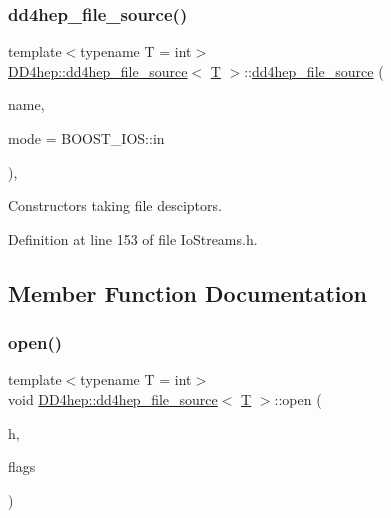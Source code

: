 \subsubsection{\texorpdfstring{dd4hep\+\_\+file\+\_\+source()}{dd4hep\_file\_source()}\hspace{0.1cm}{\footnotesize\ttfamily [4/4]}}
{\footnotesize\ttfamily template$<$typename T = int$>$ \\
\hyperlink{class_d_d4hep_1_1dd4hep__file__source}{D\+D4hep\+::dd4hep\+\_\+file\+\_\+source}$<$ \hyperlink{class_t}{T} $>$\+::\hyperlink{class_d_d4hep_1_1dd4hep__file__source}{dd4hep\+\_\+file\+\_\+source} (\begin{DoxyParamCaption}\item[{const char $\ast$}]{name,  }\item[{B\+O\+O\+S\+T\+\_\+\+I\+O\+S\+::openmode}]{mode = {\ttfamily BOOST\+\_\+IOS\+:\+:in} }\end{DoxyParamCaption})\hspace{0.3cm}{\ttfamily [inline]}, {\ttfamily [explicit]}}



Constructors taking file desciptors. 



Definition at line 153 of file Io\+Streams.\+h.



\subsection{Member Function Documentation}
\hypertarget{class_d_d4hep_1_1dd4hep__file__source_a367c212f20de3cfe79b5e69403a5a256}{}\label{class_d_d4hep_1_1dd4hep__file__source_a367c212f20de3cfe79b5e69403a5a256} 
\subsubsection{\texorpdfstring{open()}{open()}\hspace{0.1cm}{\footnotesize\ttfamily [1/4]}}
{\footnotesize\ttfamily template$<$typename T = int$>$ \\
void \hyperlink{class_d_d4hep_1_1dd4hep__file__source}{D\+D4hep\+::dd4hep\+\_\+file\+\_\+source}$<$ \hyperlink{class_t}{T} $>$\+::open (\begin{DoxyParamCaption}\item[{\hyperlink{class_d_d4hep_1_1dd4hep__file_a4d79f8d433cd7831ff818691424cd6fc}{handle\+\_\+type}}]{h,  }\item[{\hyperlink{namespace_d_d4hep_a31d19f9b0ce567067d2897fbda1761e5}{dd4hep\+\_\+file\+\_\+flags}}]{flags }\end{DoxyParamCaption})\hspace{0.3cm}{\ttfamily [inline]}}



